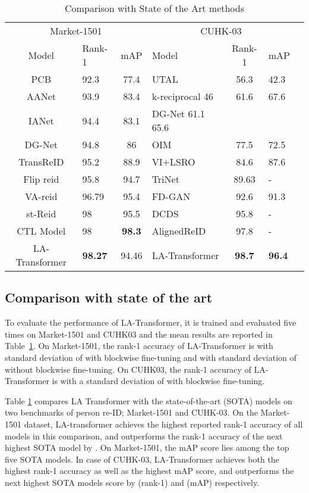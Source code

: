 \documentclass{article}
\begin{document}
\begin{table}
  \caption{Comparison with State of the Art methods}
  
  \centering
  \begin{tabular}{clclclc}
    \toprule
    \multicolumn{3}{c}{Market-1501} & \multicolumn{3}{c}{CUHK-03} \\ 
\cmidrule(r){1-3} \cmidrule(r){4-6}
    Model  & Rank-1 & mAP & Model & Rank-1 & mAP\\
    \midrule
    PCB	& 92.3	& 77.4 &UTAL  & 56.3 & 42.3\\
    AANet &	93.9	& 83.4 & k-reciprocal 46  & 61.6 & 67.6\\
    IANet	& 94.4 &	83.1 & DG-Net 61.1 65.6 \\
    DG-Net &	94.8	& 86 & OIM & 77.5 & 72.5 \\
    TransReID & 95.2 & 88.9 & VI+LSRO & 84.6 & 87.6 \\
    Flip reid	& 95.8	& 94.7 & TriNet & 89.63 & - \\
    VA-reid	& 96.79	& 95.4  & FD-GAN & 92.6 & 91.3 \\
    st-Reid	& 98	& 95.5  & DCDS & 95.8 & - \\
    CTL Model	& 98 &	\textbf{98.3} & AlignedReID & 97.8 & - \\

    LA-Transformer  & \textbf{98.27}	&  94.46 & LA-Transformer  & \textbf{98.7} & \textbf{96.4} \\
    \bottomrule
  \end{tabular}
  \label{SOTA}
\end{table}

\subsection{Comparison with state of the art} \label{SOTAComparisonSection}
To evaluate the performance of LA-Transformer, it is trained and evaluated five times on Market-1501 and CUHK03 and the mean results are reported in Table~\ref{SOTA}. On Market-1501, the rank-1 accuracy of LA-Transformer is   with standard deviation of  with blockwise fine-tuning and  with standard deviation of  without blockwise fine-tuning. On CUHK03, the rank-1 accuracy of LA-Transformer is  with a standard deviation of  with blockwise fine-tuning.

Table \ref{SOTA} compares LA Transformer with the state-of-the-art (SOTA) models on two benchmarks of person re-ID; Market-1501 and CUHK-03. On the Market-1501 dataset, LA-transformer achieves the highest reported rank-1 accuracy of all models in this comparison, and outperforms the rank-1 accuracy of the next highest SOTA model by .  On Market-1501, the mAP score lies among the top five SOTA models. In case of CUHK-03, LA-Transformer achieves both the highest rank-1 accuracy as well as the highest mAP score, and outperforms the next highest SOTA models score by  (rank-1) and  (mAP) respectively.
\end{document}
